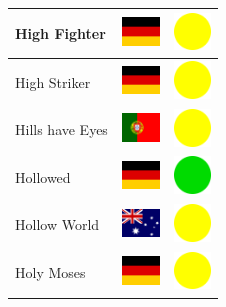 \documentclass[12pt, a4paper, twoside]{report}
\begin{document}
\begin{center}
\begin{longtable}{|p{5cm}|p{2cm}|p{2cm}|}
 High Fighter                                               & \includegraphics[width=1cm]{../img/flags/de} &   \includegraphics[width=1cm]{../likes/m} \\ \hline
 High Striker                                               & \includegraphics[width=1cm]{../img/flags/de} &   \includegraphics[width=1cm]{../likes/m} \\ \hline
 Hills have Eyes                                            & \includegraphics[width=1cm]{../img/flags/pt} &   \includegraphics[width=1cm]{../likes/m} \\ \hline
 Hollowed                                                   & \includegraphics[width=1cm]{../img/flags/de} &   \includegraphics[width=1cm]{../likes/y} \\ \hline
 Hollow World                                               & \includegraphics[width=1cm]{../img/flags/au} &   \includegraphics[width=1cm]{../likes/m} \\ \hline
 Holy Moses                                                 & \includegraphics[width=1cm]{../img/flags/de} &   \includegraphics[width=1cm]{../likes/m} \\ \hline

\end{longtable}
\end{center}
\end{document}
